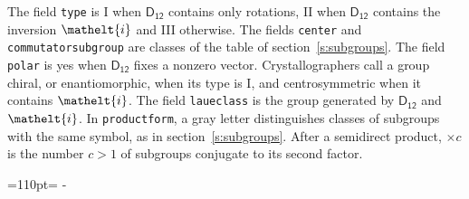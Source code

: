\documentclass[10pt,a4paper]{article}
\newcommand{\needspace}[1]{\par\penalty-100\begingroup\dimen0=#1\relax\dimen2=\pagegoal
  \advance\dimen2-\pagetotal\ifdim\dimen0>\dimen2\relax\ifdim\dimen2>0pt\vfil\break\fi\fi
  \endgroup}
\numberwithin{equation}{section}
\newcommand{\eltfont}[1]{{\let\sigma\eltsigma\mathelt{#1}}}
\newcommand{\grp}[1]{\mathsf{#1}}
\newcommand{\elt}[1]{\eltfont{#1}}
\begin{document}
\leavevmode\label{n:element.inversion}The field \texttt{type} is I when $\grp{D_{12}}$ contains only rotations, II when $\grp{D_{12}}$ contains the inversion $\elt{i}$ and III otherwise. The fields \texttt{center} and \texttt{commutatorsubgroup} are classes of the table of section~\ref{s:subgroups}. The field \texttt{polar} is yes when $\grp{D_{12}}$ fixes a nonzero vector. Crystallographers call a group chiral, or enantiomorphic, when its type is I, and centrosymmetric when it contains $\elt{i}$. The field \texttt{laueclass} is the group generated by $\grp{D_{12}}$ and $\elt{i}$.
In \texttt{productform}, a gray letter distinguishes classes of subgroups with the same symbol, as in section~\ref{s:subgroups}. \label{n:index.conjugates.c}After a semidirect product, ${\times}c$ is the number $c > 1$ of subgroups conjugate to its second factor.
\needspace{110pt}
\end{document}
